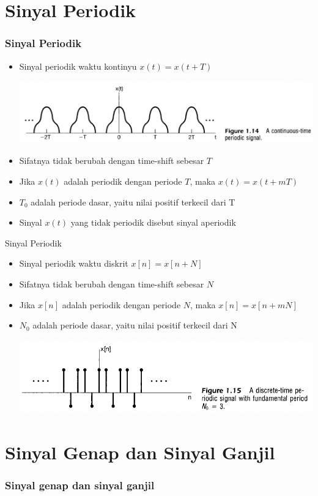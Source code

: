 \documentclass[pdflatex,compress,mathserif]{beamer}
\begin{document}
\section{Sinyal Periodik}

\begin{frame}
	\frametitle{Sinyal Periodik}
	\begin{itemize}
		\item Sinyal periodik waktu kontinyu $ x(t) = x(t + T) $
		\begin{center}
			\includegraphics[width=\linewidth]{img/img26}
		\end{center}
		\item Sifatnya tidak berubah dengan time-shift sebesar $ T $
		\item Jika $ x(t) $ adalah periodik dengan periode $ T $, maka $ x(t) = x(t + mT) $
		\item $ T_0 $ adalah periode dasar, yaitu nilai positif terkecil dari T
		\item Sinyal $ x(t) $ yang tidak periodik disebut sinyal aperiodik
	\end{itemize}
\end{frame}

\begin{frame}{Sinyal Periodik}
	\begin{itemize}
		\item Sinyal periodik waktu diskrit $ x[n] = x[n + N] $
		\item Sifatnya tidak berubah dengan time-shift sebesar $ N $
		\item Jika $ x[n] $ adalah periodik dengan periode $ N $, maka $ x[n] = x[n+mN] $
		\item $ N_0 $ adalah periode dasar, yaitu nilai positif terkecil dari N
		\begin{center}
			\includegraphics[width=\linewidth]{img/img27}
		\end{center}
	\end{itemize}
\end{frame}

\section{Sinyal Genap dan Sinyal Ganjil}

\begin{frame}
	\frametitle{Sinyal genap dan sinyal ganjil}
\end{frame}
\end{document}

